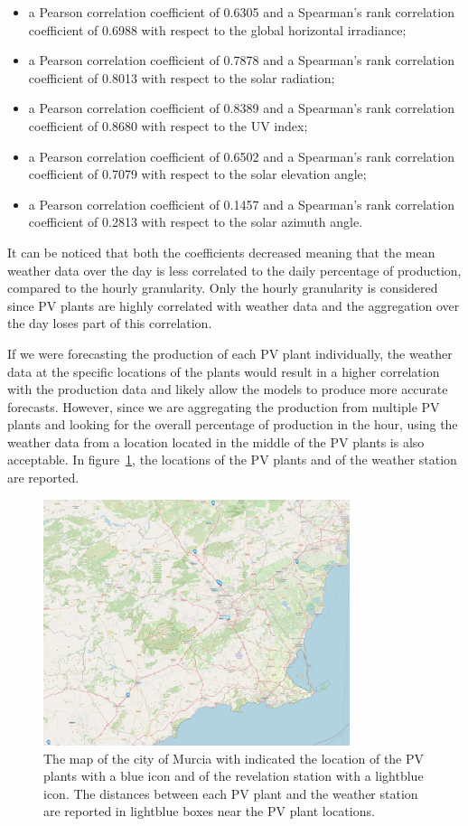 \begin{itemize}
  \item a Pearson correlation coefficient of 0.6305 and a Spearman's rank correlation coefficient of 0.6988 with respect to the global horizontal irradiance;
  \item a Pearson correlation coefficient of 0.7878 and a Spearman's rank correlation coefficient of 0.8013 with respect to the solar radiation;
  \item a Pearson correlation coefficient of 0.8389 and a Spearman's rank correlation coefficient of 0.8680 with respect to the UV index;
  \item a Pearson correlation coefficient of 0.6502 and a Spearman's rank correlation coefficient of 0.7079 with respect to the solar elevation angle;
  \item a Pearson correlation coefficient of 0.1457 and a Spearman's rank correlation coefficient of 0.2813 with respect to the solar azimuth angle.
\end{itemize}
It can be noticed that both the coefficients decreased meaning that the mean weather data over the day is less correlated to the daily percentage of production, compared to the hourly granularity.
Only the hourly granularity is considered since PV plants are highly correlated with weather data and the aggregation over the day loses part of this correlation.

If we were forecasting the production of each PV plant individually, the weather data at the specific locations of the plants would result in a higher correlation with the production data and likely allow the models to produce more accurate forecasts.
However, since we are aggregating the production from multiple PV plants and looking for the overall percentage of production in the hour, using the weather data from a location located in the middle of the PV plants is also acceptable.
In figure~\ref{fig:pvplantsmap}, the locations of the PV plants and of the weather station are reported.

\begin{figure}[H]
\centering
\includegraphics[width=0.8\textwidth]{images/production/pv_plants_map}
\caption{The map of the city of Murcia with indicated the location of the PV plants with a blue icon and of the revelation station with a lightblue icon. The distances between each PV plant and the weather station are reported in lightblue boxes near the PV plant locations.}
\label{fig:pvplantsmap}
\end{figure}

